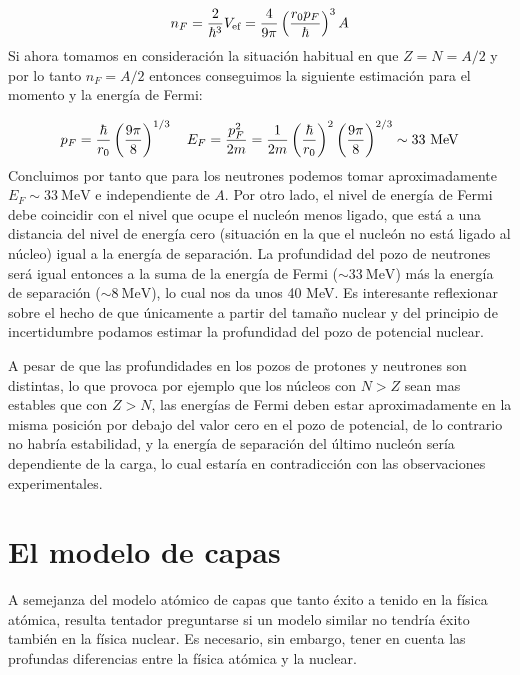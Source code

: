\begin{equation}
	n_F = \frac{2}{\hbar^3}V_{\text{ef}} = \frac{4}{9\pi} \left( \frac{r_0 p_F}{\hbar} \right)^3 A
\end{equation}
Si ahora tomamos en consideración la situación habitual en que $Z=N=A/2$ y por lo tanto $n_F=A/2$ entonces conseguimos la siguiente estimación para el momento y la energía de Fermi:

\begin{equation}
	p_F = \frac{\hbar}{r_0} \parentesis{\frac{9\pi}{8}}^{1/3} \quad E_F = \frac{p_F^2}{2m} = \frac{1}{2m} \parentesis{\frac{\hbar}{r_0}}^2 \parentesis{\frac{9\pi}{8}}^{2/3} \sim 33\ \unit{\MeV}
\end{equation}
Concluimos por tanto que para los neutrones podemos tomar aproximadamente $E_F\sim 33 \ \unit{\MeV}$ e independiente de $A$. Por otro lado, el nivel de energía de Fermi debe coincidir con el nivel que ocupe el nucleón menos ligado, que está a una distancia del nivel de energía cero (situación en la que el nucleón no está ligado al núcleo) igual a la energía de separación. La profundidad del pozo de neutrones será igual entonces a la suma de la energía de Fermi ($\sim 33 \ \unit{\MeV}$) más la energía de separación ($\sim 8 \ \unit{\MeV}$), lo cual nos da unos 40 MeV. Es interesante reflexionar sobre el hecho de que únicamente a partir del tamaño nuclear y del principio de incertidumbre podamos estimar la profundidad del pozo de potencial nuclear. 


A pesar de que las profundidades en los pozos de protones y neutrones son distintas, lo que provoca por ejemplo que los núcleos con $N>Z$ sean mas estables que con $Z>N$, las energías de Fermi deben estar aproximadamente en la misma posición por debajo del valor cero en el pozo de potencial, de lo contrario no habría estabilidad, y la energía de separación del último nucleón sería dependiente de la carga, lo cual estaría en contradicción con las observaciones experimentales.





\section{El modelo de capas}

A semejanza del modelo atómico de capas que tanto éxito a tenido en la física atómica, resulta tentador preguntarse si un modelo similar no tendría éxito también en la física nuclear. Es necesario, sin embargo, tener en cuenta las profundas diferencias entre la física atómica y la nuclear. 

